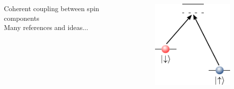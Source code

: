 \begin{frame}
\begin{columns}[t]



\vspace{0.4cm}


\textcolor{bellblue}{Coherent coupling between spin components}\\
Many references and ideas...
\begin{figure}
\centering
\includegraphics[width=0.4\linewidth]{Figures/Coherent_Coupling.pdf}
\end{figure}



\end{columns}


\end{frame}
